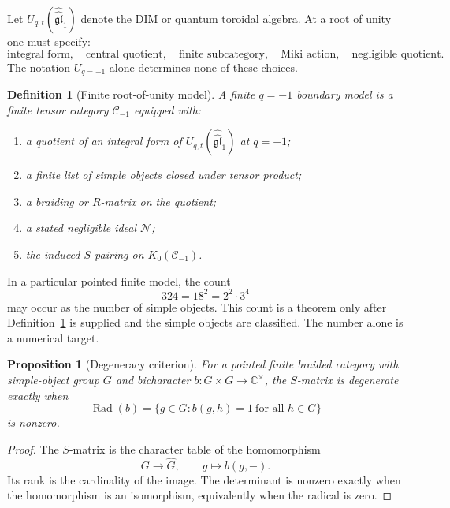 \documentclass[11pt]{article}
\newtheorem{proposition}[theorem]{Proposition}
\newtheorem{definition}[theorem]{Definition}
\providecommand{\C}{\mathbb{C}}
\begin{document}
Let \(U_{q,t}(\widehat{\widehat{\mathfrak{gl}}}_1)\) denote the DIM or
quantum toroidal algebra.  At a root of unity one must specify:
\[
  \text{integral form},\quad
  \text{central quotient},\quad
  \text{finite subcategory},\quad
  \text{Miki action},\quad
  \text{negligible quotient}.
\]
The notation \(U_{q=-1}\) alone determines none of these choices.

\begin{definition}[Finite root-of-unity model]
\label{def:finite-root-model}
A finite \(q=-1\) boundary model is a finite tensor category
\(\mathcal C_{-1}\) equipped with:
\begin{enumerate}[label=\textup{(\roman*)}]
\item a quotient of an integral form of
\(U_{q,t}(\widehat{\widehat{\mathfrak{gl}}}_1)\) at \(q=-1\);
\item a finite list of simple objects closed under tensor product;
\item a braiding or \(R\)-matrix on the quotient;
\item a stated negligible ideal \(\mathcal N\);
\item the induced \(S\)-pairing on \(K_0(\mathcal C_{-1})\).
\end{enumerate}
\end{definition}

In a particular pointed finite model, the count
\[
  324=18^2=2^2\cdot 3^4
\]
may occur as the number of simple objects.  This count is a theorem only
after Definition~\ref{def:finite-root-model} is supplied and the simple
objects are classified.  The number alone is a numerical target.

\begin{proposition}[Degeneracy criterion]
\label{prop:s-degeneracy-criterion}
For a pointed finite braided category with simple-object group \(G\) and
bicharacter \(b:G\times G\to\C^\times\), the \(S\)-matrix is degenerate
exactly when
\[
  \operatorname{Rad}(b)=
  \{g\in G: b(g,h)=1\ \text{for all }h\in G\}
\]
is nonzero.
\end{proposition}

\begin{proof}
The \(S\)-matrix is the character table of the homomorphism
\[
  G\longrightarrow \widehat G,\qquad
  g\longmapsto b(g,-).
\]
Its rank is the cardinality of the image.  The determinant is nonzero
exactly when the homomorphism is an isomorphism, equivalently when the
radical is zero.
\end{proof}
\end{document}
